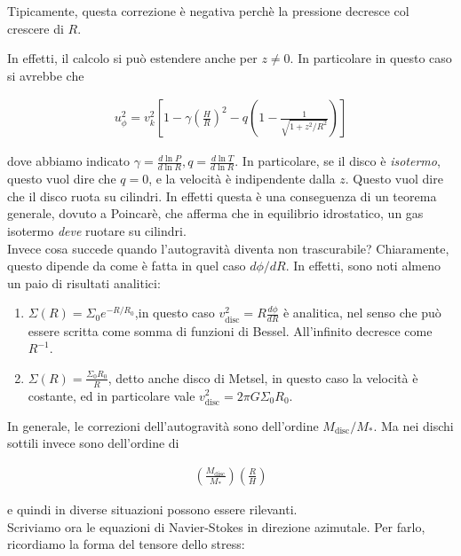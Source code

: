 \documentclass{report}
\begin{document}
Tipicamente, questa correzione è negativa perchè la pressione decresce col crescere di \(R\). 

In effetti, il calcolo si può estendere anche per \(z \neq 0\). In particolare in questo caso si avrebbe che 

\begin{align}
    u^2_\phi = v_k^2\left[1 - \gamma \left(\frac{H}{R} \right)^2 - q\left(1 - \frac{1}{\sqrt{1 + z^2/R^2}} \right)\right] 
\end{align}

dove abbiamo indicato \(\gamma = \frac{d\ln P}{d\ln R}, q = \frac{d\ln T}{d\ln R}\). In particolare, se il disco è \emph{isotermo}, questo vuol dire che \(q=0\), e la velocità è indipendente dalla \(z\). Questo vuol dire che il disco ruota su cilindri. In effetti questa è una conseguenza di un teorema generale, dovuto a Poincarè, che afferma che in equilibrio idrostatico, un gas isotermo \emph{deve} ruotare su cilindri. \\

Invece cosa succede quando l'autogravità diventa non trascurabile? Chiaramente, questo dipende da come è fatta in quel caso \(d\phi/dR\). In effetti, sono noti almeno un paio di risultati analitici: 

\begin{enumerate}
    \item \(\Sigma(R) = \Sigma_0 e^{-R/R_0}\),in questo caso \(v^2_{\text{disc}} = R\frac{d\phi}{dR}\) è analitica, nel senso che può essere scritta come somma di funzioni di Bessel. All'infinito decresce come \(R^{-1}\). 
    \item \(\Sigma(R) = \frac{\Sigma_0R_0}{R}\), detto anche disco di Metsel, in questo caso la velocità è costante, ed in particolare vale \(v^2_{\text{disc}} = 2\pi G\Sigma_0 R_0\). 
\end{enumerate}


In generale, le correzioni dell'autogravità sono dell'ordine \(M_{\text{disc}}/M_{*}\). Ma nei dischi sottili invece sono dell'ordine di

\begin{align}
    \left(\frac{M_{\text{disc}}}{M_*} \right)\left(\frac{R}{H}\right)
\end{align}

e quindi in diverse situazioni possono essere rilevanti. \\

Scriviamo ora le equazioni di Navier-Stokes in direzione azimutale. Per farlo, ricordiamo la forma del tensore dello stress: 
\end{document}
